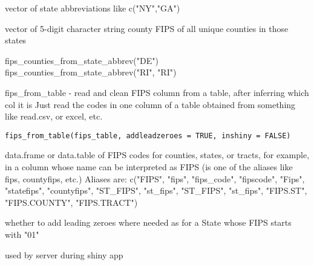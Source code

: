 \documentclass[a4paper]{book}
\begin{document}
%
\begin{Arguments}
\begin{ldescription}
\item[\code{ST}] vector of state abbreviations like c("NY","GA")
\end{ldescription}
\end{Arguments}
%
\begin{Value}
vector of 5-digit character string county FIPS of all unique counties in those states
\end{Value}
%
\begin{Examples}
\begin{ExampleCode}
  fips_counties_from_state_abbrev("DE")
  fips_counties_from_state_abbrev("RI", "RI")
\end{ExampleCode}
\end{Examples}
%
\begin{Description}\relax
fips\_from\_table - read and clean FIPS column from a table, after inferring which col it is
Just read the codes in one column of a table obtained from something like read.csv, or excel, etc.
\end{Description}
%
\begin{Usage}
\begin{verbatim}
fips_from_table(fips_table, addleadzeroes = TRUE, inshiny = FALSE)
\end{verbatim}
\end{Usage}
%
\begin{Arguments}
\begin{ldescription}
\item[\code{fips\_table}] data.frame or data.table of FIPS codes for counties, states, or tracts,
for example, in a column whose name can be interpreted as FIPS
(is one of the aliases like fips, countyfips, etc.)
Aliases are: c("FIPS", "fips", "fips\_code", "fipscode", "Fips", "statefips",
"countyfips", "ST\_FIPS", "st\_fips", "ST\_FIPS", "st\_fips", "FIPS.ST",
"FIPS.COUNTY", "FIPS.TRACT")

\item[\code{addleadzeroes}] whether to add leading zeroes where needed as for a State whose FIPS starts with "01"

\item[\code{inshiny}] used by server during shiny app
\end{ldescription}
\end{Arguments}
\end{document}
